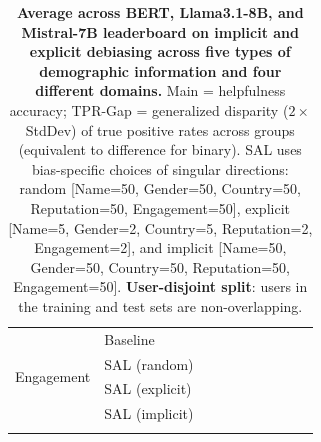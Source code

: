 \begin{table}[th!]
{\begin{tabular}{ll rr  rr  rr  rr}
\multirow{4}{*}{Engagement} & Baseline &  &  &  &  &  &  &  &  \\
\addlinespace[4pt]
& SAL (random) &  &  &  &  &  &  &  &  \\
\addlinespace[4pt]
& SAL (explicit) &  &  &  &  &  &  &  &  \\
\addlinespace[4pt]
& SAL (implicit) &  &  &  &  &  &  &  &  \\
\addlinespace[4pt]
\bottomrule
\end{tabular}
}
\caption{\textbf{Average across BERT, Llama3.1-8B, and Mistral-7B leaderboard on implicit and explicit debiasing across five types of demographic information and four different domains.}
Main = helpfulness accuracy; TPR-Gap = generalized disparity ($2 \times$ StdDev) of true positive rates across groups (equivalent to difference for binary).
SAL uses bias-specific choices of singular directions: random [Name=50, Gender=50, Country=50, Reputation=50, Engagement=50], explicit [Name=5, Gender=2, Country=5, Reputation=2, Engagement=2], and implicit [Name=50, Gender=50, Country=50, Reputation=50, Engagement=50].
\textbf{User-disjoint split}: users in the training and test sets are non-overlapping.}
\label{tab:ste-summary-average-disjoint}
\end{table}
